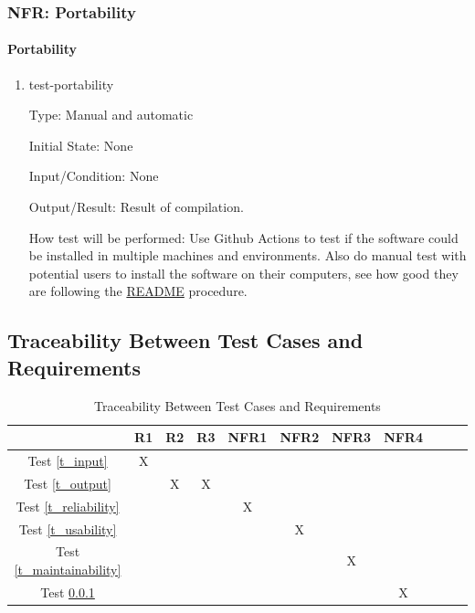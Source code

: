 \documentclass[12pt, titlepage]{article}
\begin{document}
		
\subsubsection{NFR: Portability}\label{t_portability}
		
\paragraph{Portability}

\begin{enumerate}

\item{test-portability}

Type: Manual and automatic
					
Initial State: None
					
Input/Condition: None
					
Output/Result: Result of compilation.
					
How test will be performed: Use Github Actions to test if the software could be installed in multiple machines and environments. Also do manual test with potential users to install the software on their computers, see how good they are following the \href{https://github.com/smiths/BridgeChlorideExposurePredictor/blob/main/README.md}{README} procedure.

\end{enumerate}
		

\subsection{Traceability Between Test Cases and Requirements}

\begin{table}[h]
\centering
\begin{tabular}{|c|c|c|c|c|c|c|c|c|c|c|}
\hline
	& R1 & R2 & R3  & NFR1 & NFR2 & NFR3 & NFR4  \\
\hline
Test \ref{t_input}        & X & & & & & &  \\ \hline
Test \ref{t_output}        & & X & X & & & &  \\ \hline
Test \ref{t_reliability}        & & & & X & & &  \\ \hline
Test \ref{t_usability}        & & & & & X & &  \\ \hline
Test \ref{t_maintainability}        & & & & & & X &  \\ \hline
Test \ref{t_portability}        & & & & & & & X  \\ \hline

\end{tabular}
\caption{Traceability Between Test Cases and Requirements}
\label{Table:test_requirements}
\end{table}
\end{document}
